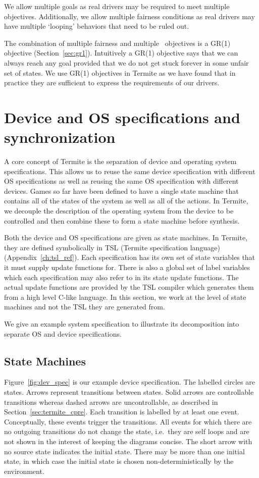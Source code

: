 We allow multiple goals as real drivers may be required to meet multiple objectives. Additionally, we allow multiple fairness conditions as real drivers may have multiple `looping' behaviors that need to be ruled out.

The combination of multiple fairness and multiple \buchi\ objectives is a GR(1) objective (Section~\ref{sec:gr1}). Intuitively a GR(1) objective says that we can always reach any goal provided that we do not get stuck forever in some unfair set of states. We use GR(1) objectives in Termite as we have found that in practice they are sufficient to express the requirements of our drivers.

\section{Device and OS specifications and synchronization}
\label{sec:composition}

A core concept of Termite is the separation of device and operating system specifications. This allows us to reuse the same device specification with different OS specifications as well as reusing the same OS specification with different devices. Games so far have been defined to have a single state machine that contains all of the states of the system as well as all of the actions. In Termite, we decouple the description of the operating system from the device to be controlled and then combine these to form a state machine before synthesis.

Both the device and OS specifications are given as state machines. In Termite, they are defined symbolically in TSL (Termite specification language) (Appendix~\ref{ch:tsl_ref}). Each specification has its own set of state variables that it must supply update functions for. There is also a global set of label variables which each specification may also refer to in its state update functions. The actual update functions are provided by the TSL compiler which generates them from a high level C-like language. In this section, we work at the level of state machines and not the TSL they are generated from.

We give an example system specification to illustrate its decomposition into separate OS and device specifications. 

\subsection{State Machines}

Figure~\ref{fig:dev_spec} is our example device specification. The labelled circles are states. Arrows represent transitions between states. Solid arrows are controllable transitions whereas dashed arrows are uncontrollable, as described in Section~\ref{sec:termite_cpre}. Each transition is labelled by at least one event. Conceptually, these events trigger the transitions. All events for which there are no outgoing transitions do not change the state, i.e.\ they are self loops and are not shown in the interest of keeping the diagrams concise. The short arrow with no source state indicates the initial state. There may be more than one initial state, in which case the initial state is chosen non-deterministically by the environment.

